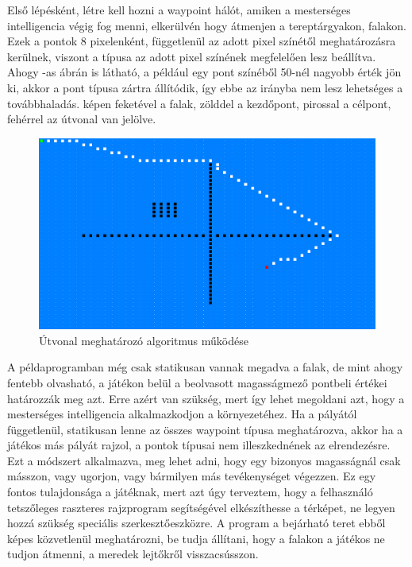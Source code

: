 Első lépésként, létre kell hozni a waypoint hálót, amiken a mesterséges intelligencia végig fog menni, elkerülvén hogy átmenjen a tereptárgyakon, falakon. Ezek a pontok 8 pixelenként, függetlenül az adott pixel színétől meghatározásra kerülnek, viszont a típusa az adott pixel színének megfelelően lesz beállítva. Ahogy -as ábrán is látható, a például egy pont színéből 50-nél nagyobb érték jön ki, akkor a pont típusa zártra állítódik, így ebbe az irányba nem lesz lehetséges a továbbhaladás.  képen feketével a falak, zölddel a kezdőpont, pirossal a célpont, fehérrel az útvonal van jelölve.

\begin{figure}[h]
\centering
\includegraphics[scale=0.48]{kepek/mi_printscreen.png}
\caption{Útvonal meghatározó algoritmus működése}
\label{fig:mi_printscreen}
\end{figure}

A példaprogramban még csak statikusan vannak megadva a falak, de mint ahogy fentebb olvasható, a játékon belül a beolvasott magasságmező pontbeli értékei határozzák meg azt. Erre azért van szükség, mert így lehet megoldani azt, hogy a mesterséges intelligencia alkalmazkodjon a környezetéhez. Ha a pályától függetlenül, statikusan lenne az összes waypoint típusa meghatározva, akkor ha a játékos más pályát rajzol, a pontok típusai nem illeszkednének az elrendezésre. Ezt a módszert alkalmazva, meg lehet adni, hogy egy bizonyos magasságnál csak másszon, vagy ugorjon, vagy bármilyen más tevékenységet végezzen. Ez egy fontos tulajdonsága a játéknak, mert azt úgy terveztem, hogy a felhasználó tetszőleges raszteres rajzprogram segítségével elkészíthesse a térképet, ne legyen hozzá szükség speciális szerkesztőeszközre. A program a bejárható teret ebből képes közvetlenül meghatározni, be tudja állítani, hogy a falakon a játékos ne tudjon átmenni, a meredek lejtőkről visszacsússzon.

